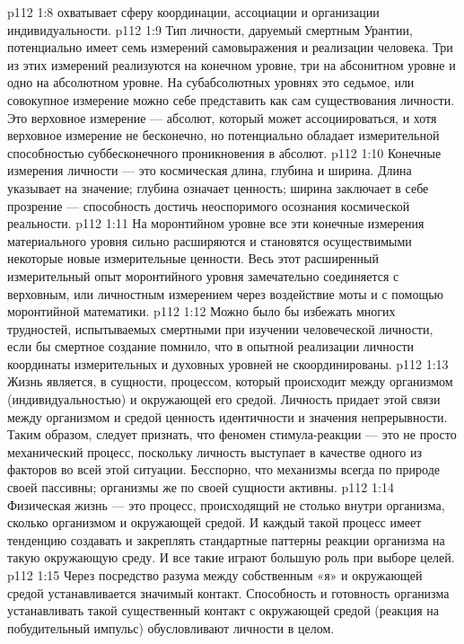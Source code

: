 \vs p112 1:8 \bibnobreakspace {} охватывает сферу координации, ассоциации и организации индивидуальности.
\vs p112 1:9 \pc Тип личности, даруемый смертным Урантии, потенциально имеет семь измерений самовыражения и реализации человека. Три из этих измерений реализуются на конечном уровне, три на абсонитном уровне и одно на абсолютном уровне. На субабсолютных уровнях это седьмое, или совокупное измерение можно себе представить как сам  существования личности. Это верховное измерение --- абсолют, который может ассоциироваться, и хотя верховное измерение не бесконечно, но потенциально обладает измерительной способностью суббесконечного проникновения в абсолют.
\vs p112 1:10 Конечные измерения личности --- это космическая длина, глубина и ширина. Длина указывает на значение; глубина означает ценность; ширина заключает в себе прозрение --- способность достичь неоспоримого осознания космической реальности.
\vs p112 1:11 На моронтийном уровне все эти конечные измерения материального уровня сильно расширяются и становятся осуществимыми некоторые новые измерительные ценности. Весь этот расширенный измерительный опыт моронтийного уровня замечательно соединяется с верховным, или личностным измерением через воздействие моты и с помощью моронтийной математики.
\vs p112 1:12 Можно было бы избежать многих трудностей, испытываемых смертными при изучении человеческой личности, если бы смертное создание помнило, что в опытной реализации личности координаты измерительных и духовных уровней не скоординированы.
\vs p112 1:13 \pc Жизнь является, в сущности, процессом, который происходит между организмом (индивидуальностью) и окружающей его средой. Личность придает этой связи между организмом и средой ценность идентичности и значения непрерывности. Таким образом, следует признать, что феномен стимула\hyp{}реакции --- это не просто механический процесс, поскольку личность выступает в качестве одного из факторов во всей этой ситуации. Бесспорно, что механизмы всегда по природе своей пассивны; организмы же по своей сущности активны.
\vs p112 1:14 Физическая жизнь --- это процесс, происходящий не столько внутри организма, сколько  организмом и окружающей средой. И каждый такой процесс имеет тенденцию создавать и закреплять стандартные паттерны реакции организма на такую окружающую среду. И все такие  играют большую роль при выборе целей.
\vs p112 1:15 Через посредство разума между собственным «я» и окружающей средой устанавливается значимый контакт. Способность и готовность организма устанавливать такой существенный контакт с окружающей средой (реакция на побудительный импульс) обусловливают  личности в целом.
